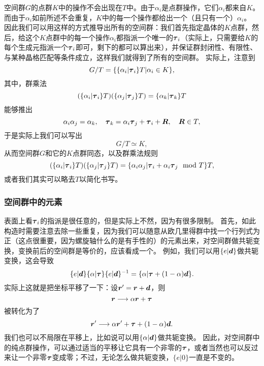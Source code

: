 空间群$G$的点群$K$中的操作不会出现在$T$中。由于$\alpha_i$是点群操作，它们$\alpha_i$都来自$K$。而由于$\alpha_i$如前所述不会重复，$K$中的每一个操作都给出一个（且只有一个）$\alpha_i$。
因此我们可以用这样的方式推导出所有的空间群：我们首先指定晶体的$K$点群，然后，给这个$K$点群中的每一个操作$\alpha_i$都指派一个唯一的$\vb*{\tau}_i$（实际上，只需要给$K$的每个生成元指派一个$\vb*{\tau}_i$即可，剩下的都可以算出来），并保证群封闭性、有限性、与某种晶格匹配等条件成立，这样我们就得到了所有的空间群。
实际上，注意到
\[
    G / T = \{ \{\alpha_i | \vb*{\tau}_i \} T | \alpha_i \in K \},
\]
其中，群乘法
\[
    (\{\alpha_i | \vb*{\tau}_i \} T) (\{\alpha_j | \vb*{\tau}_j \} T) = \{\alpha_k | \vb*{\tau}_k \} T
\]
能够推出
\[
    \alpha_i \alpha_j = \alpha_k, \quad \vb*{\tau}_k = \alpha_i \vb*{\tau}_j + \vb*{\tau}_i + \vb*{R}, \quad \vb*{R} \in T,
\] 
于是实际上我们可以写出
\begin{equation}
    G / T \simeq K,
\end{equation}
从而空间群$G$和它的$K$点群同态，以及群乘法规则
\begin{equation}
    (\{\alpha_i | \vb*{\tau}_i \} T) (\{\alpha_j | \vb*{\tau}_j \} T) = \{\alpha_i \alpha_j | \vb*{\tau}_i + \alpha_i \vb*{\tau}_j \mod{T} \} T,
\end{equation}
或者我们其实可以略去$T$以简化书写。

\subsubsection{空间群中的元素} 

表面上看$\vb*{\tau}_i$的指派是很任意的，但是实际上不然，因为有很多限制。
首先，如此构造时需要注意去除一些重复，因为我们可以随意从欧几里得群中找一个行列式为正（这点很重要，因为螺旋轴什么的是有手性的）的元素出来，对空间群做共轭变换，变换前后的空间群是等价的，应该看成一个。
例如，我们可以用$\{e | \vb*{d}\}$做共轭变换，这会导致
\[
    \{e | \vb*{d}\} \{ \alpha | \vb*{\tau} \} \{ e | \vb*{d} \}^{-1} = \{ \alpha | \vb*{\tau} + (1 - \alpha) \vb*{d} \}.
\]
实际上这就是把坐标平移了一下：设$\vb*{r}' = \vb*{r} + \vb*{d}$，则
\[
    \vb*{r} \longrightarrow \alpha \vb*{r} + \vb*{\tau}
\]
被转化为了
\begin{equation}
    \vb*{r}' \longrightarrow \alpha \vb*{r}' + \vb*{\tau} + (1 - \alpha) \vb*{d}.
    \label{eq:conju-alpha}
\end{equation}
我们也可以不局限在平移上，比如说可以用$\{\alpha | \vb*{d}\}$做共轭变换。
因此，对空间群中的纯点群操作，可以通过适当的平移让它具有一个非零的$\vb*{\tau}$，或者当然也可以反过来让一个非零$\vb*{\tau}$变成零；不过，无论怎么做共轭变换，$\{e | 0\}$一直是不变的。

